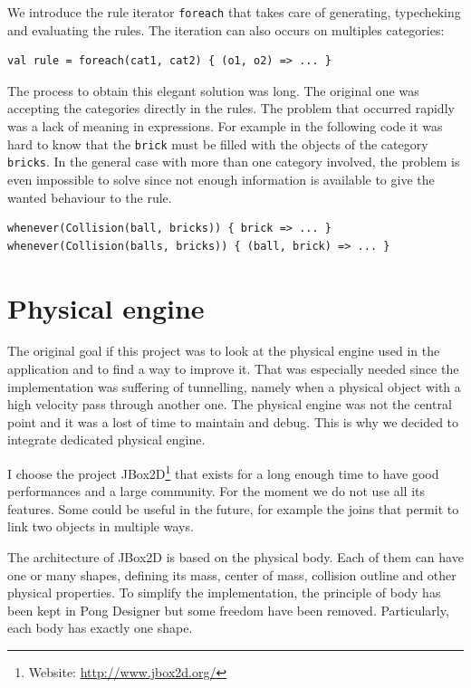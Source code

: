 \documentclass[11pt,a4paper]{article}
\begin{document}
We introduce the rule iterator \texttt{foreach} that takes care of generating, typecheking and evaluating the rules. The iteration can also occurs on multiples categories:

\begin{lstlisting}
val rule = foreach(cat1, cat2) { (o1, o2) => ... }
\end{lstlisting}

The process to obtain this elegant solution was long. The original one was accepting the categories directly in the rules. The problem that occurred rapidly was a lack of meaning in expressions. For example in the following code it was hard to know that the \texttt{brick} must be filled with the objects of the category \texttt{bricks}. In the general case with more than one category involved, the problem is even impossible to solve since not enough information is available to give the wanted behaviour to the rule.
\begin{lstlisting}
whenever(Collision(ball, bricks)) { brick => ... }
whenever(Collision(balls, bricks)) { (ball, brick) => ... }
\end{lstlisting}

\section{Physical engine}
The original goal if this project was to look at the physical engine used in the application and to find a way to improve it. That was especially needed since the implementation was suffering of tunnelling, namely when a physical object with a high velocity pass through another one. The physical engine was not the central point and it was a lost of time to maintain and debug. This is why we decided to integrate dedicated physical engine. 

I choose the project JBox2D\footnote{Website: \url{http://www.jbox2d.org/}} that exists for a long enough time to have good performances and a large community. For the moment we do not use all its features. Some could be useful in the future, for example the joins that permit to link two objects in multiple ways.

The architecture of JBox2D is based on the physical body. Each of them can have one or many shapes, defining its mass, center of mass, collision outline and other physical properties. To simplify the implementation, the principle of body has been kept in Pong Designer but some freedom have been removed. Particularly, each body has exactly one shape.
\end{document}
